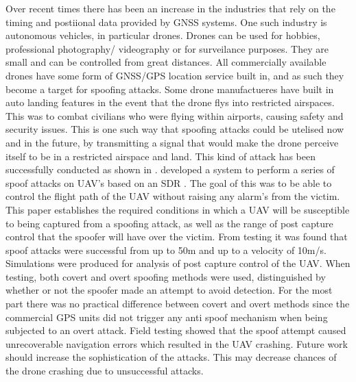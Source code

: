 Over recent times there has been an increase in the industries that rely on the timing and postiional data provided by GNSS systems. One such industry is autonomous
vehicles, in particular drones. Drones can be used for hobbies, professional photography/ videography or for surveilance purposes. They are small and can be controlled from great
distances. All commercially available drones have some form of GNSS/GPS location service built in, and as such they become a target for spoofing attacks. Some drone
manufactueres have built in auto landing features in the event that the drone flys into restricted airspaces. This was to combat civilians who were flying within
airports, causing safety and security issues. This is one such way that spoofing attacks could be utelised now and in the future, by transmitting a signal that would make
the drone perceive itself to be in a restricted airspace and land. This kind of attack has been successfully conducted as shown in \cite{RN4}. 
\textcite{RN21} developed a system to perform a series of spoof attacks on UAV's based on an SDR \cite{RN23}. The goal of this was to be able to 
control the flight path of the UAV without raising any alarm's from the victim. This paper establishes the required conditions in which a UAV will
be susceptible to being captured from a spoofing attack, as well as the range of post capture control that the spoofer will have over the victim.
From testing it was found that spoof attacks were successful from up to 50m and up to a velocity of 10m/s.
Simulations were produced for analysis of post capture control of the UAV. 
When testing, both covert and overt spoofing methods were used, distinguished by whether or not the spoofer made an attempt to avoid detection. For the most part there
was no practical difference between covert and overt methods since the commercial GPS units did not trigger any anti spoof mechanism when being subjected to an overt
attack. Field testing showed that the spoof attempt caused unrecoverable navigation errors which resulted in the UAV crashing. Future work should increase the
sophistication of the attacks. This may decrease chances of the drone crashing due to unsuccessful attacks.

